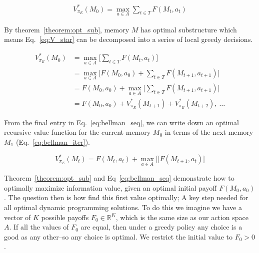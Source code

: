 \documentclass[9pt,twocolumn,twoside]{pnas-new}
\begin{document}
\begin{equation} \label{eq:V_star}
    \begin{split}
        V^*_{\pi_E}(M_0) = \max_{a \in A} \sum_{t \in T} F(M_t, a_t)
    \end{split}
\end{equation}

By theorem~\ref{theorem:opt_sub}, memory $M$ has optimal substructure which means Eq.~\ref{eq:V_star} can be decomposed into a series of local greedy decisions.

\begin{equation} \label{eq:bellman_seq}
    \begin{split}
        V^*_{\pi_E}(M_0) &= \max_{a \in A} \Big [\sum_{t \in T} F(M_t, a_t)\Big ]\\
                         &= \max_{a \in A} \Big [F(M_0, a_0) + \sum_{t \in T} F(M_{t+1}, a_{t+1})\Big ]\\
                         &= F(M_0, a_0) + \max_{a \in A} \Big [\sum_{t \in T} F(M_{t+1}, a_{t+1}) \Big ]\\
                         &= F(M_0, a_0) + V^*_{\pi_E}(M_{t+1}) + V^*_{\pi_E}(M_{t+2}),\ \ldots
    \end{split}
\end{equation}

From the final entry in Eq.~\ref{eq:bellman_seq}, we can write down an optimal recursive value function for the current memory $M_0$ in terms of the next memory $M_1$ (Eq.~\ref{eq:bellman_iter}).

\begin{equation} \label{eq:bellman_iter}
    V^*_{\pi_E}(M_{t}) = F(M_{t}, a_{t}) + \max_{a \in A} \Big [ [F(M_{t+1}, a_t) \Big ]
\end{equation}
    
Theorem~\ref{theorem:opt_sub} and Eq~\ref{eq:bellman_seq} demonstrate how to optimally maximize information value, given an optimal initial payoff $F(M_0, a_0)$. The question then is how find this first value optimally; A key step needed for all optimal dynamic programming solutions. To do this we imagine we have a vector of $K$ possible payoffs $F_0 \in \mathbb{R}^K$, which is the same size as our action space $A$. If all the values of $F_0$ are equal, then under a greedy policy any choice is a good as any other--so any choice is optimal. We restrict the initial value to $F_0 > 0$.  %

\end{document}
